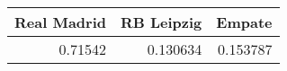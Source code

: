 \begin{tabular}{rrr}
\hline
   Real Madrid &   RB Leipzig &   Empate \\
\hline
       0.71542 &     0.130634 & 0.153787 \\
\hline
\end{tabular}